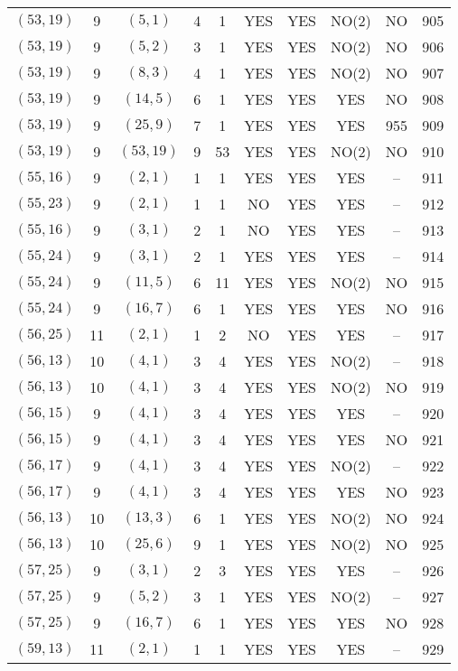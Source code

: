 \begin{longtable}{|c|c|c|c|c|c|c|c|c|c|}
$(53, 19)$ & 9 & $(5, 1)$ & 4 & 1 & YES & YES & NO(2) & NO & 905\\
$(53, 19)$ & 9 & $(5, 2)$ & 3 & 1 & YES & YES & NO(2) & NO & 906\\
$(53, 19)$ & 9 & $(8, 3)$ & 4 & 1 & YES & YES & NO(2) & NO & 907\\
$(53, 19)$ & 9 & $(14, 5)$ & 6 & 1 & YES & YES & YES & NO & 908\\
$(53, 19)$ & 9 & $(25, 9)$ & 7 & 1 & YES & YES & YES & 955 & 909\\
$(53, 19)$ & 9 & $(53, 19)$ & 9 & 53 & YES & YES & NO(2) & NO & 910\\
$(55, 16)$ & 9 & $(2, 1)$ & 1 & 1 & YES & YES & YES & -- & 911\\
$(55, 23)$ & 9 & $(2, 1)$ & 1 & 1 & NO & YES & YES & -- & 912\\
$(55, 16)$ & 9 & $(3, 1)$ & 2 & 1 & NO & YES & YES & -- & 913\\
$(55, 24)$ & 9 & $(3, 1)$ & 2 & 1 & YES & YES & YES & -- & 914\\
$(55, 24)$ & 9 & $(11, 5)$ & 6 & 11 & YES & YES & NO(2) & NO & 915\\
$(55, 24)$ & 9 & $(16, 7)$ & 6 & 1 & YES & YES & YES & NO & 916\\
$(56, 25)$ & 11 & $(2, 1)$ & 1 & 2 & NO & YES & YES & -- & 917\\
$(56, 13)$ & 10 & $(4, 1)$ & 3 & 4 & YES & YES & NO(2) & -- & 918\\
$(56, 13)$ & 10 & $(4, 1)$ & 3 & 4 & YES & YES & NO(2) & NO & 919\\
$(56, 15)$ & 9 & $(4, 1)$ & 3 & 4 & YES & YES & YES & -- & 920\\
$(56, 15)$ & 9 & $(4, 1)$ & 3 & 4 & YES & YES & YES & NO & 921\\
$(56, 17)$ & 9 & $(4, 1)$ & 3 & 4 & YES & YES & NO(2) & -- & 922\\
$(56, 17)$ & 9 & $(4, 1)$ & 3 & 4 & YES & YES & YES & NO & 923\\
$(56, 13)$ & 10 & $(13, 3)$ & 6 & 1 & YES & YES & NO(2) & NO & 924\\
$(56, 13)$ & 10 & $(25, 6)$ & 9 & 1 & YES & YES & NO(2) & NO & 925\\
$(57, 25)$ & 9 & $(3, 1)$ & 2 & 3 & YES & YES & YES & -- & 926\\
$(57, 25)$ & 9 & $(5, 2)$ & 3 & 1 & YES & YES & NO(2) & -- & 927\\
$(57, 25)$ & 9 & $(16, 7)$ & 6 & 1 & YES & YES & YES & NO & 928\\
$(59, 13)$ & 11 & $(2, 1)$ & 1 & 1 & YES & YES & YES & -- & 929\\

\end{longtable}
